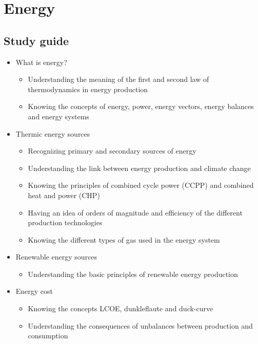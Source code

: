 \documentclass[../summary.tex]{subfiles}
\begin{document}
	
	\section{Energy}
	
	\subsection{Study guide}
	\begin{itemize} 
		\setlength{\itemsep}{0pt}
		
		\item What is energy?
		\begin{itemize}
			\item Understanding the meaning of the first and second law of thermodynamics in energy production
			\item Knowing the concepts of energy, power, energy vectors, energy balances and energy systems
		\end{itemize}
		
		\item Thermic energy sources
		\begin{itemize}
			\item Recognizing primary and secondary sources of energy
			\item Understanding the link between energy production and climate change
			\item Knowing the principles of combined cycle power (CCPP) and combined heat and power (CHP)
			\item Having an idea of orders of magnitude and efficiency of the different production technologies
			\item Knowing the different types of gas used in the energy system
		\end{itemize}
		
		\item Renewable energy sources
		\begin{itemize}
			\item Understanding the basic principles of renewable energy production
		\end{itemize}
		
		\item Energy cost
		\begin{itemize}
			\item Knowing the concepts LCOE, dunkleflaute and duck-curve
			\item Understanding the consequences of unbalances between production and consumption
		\end{itemize}
		

\end{itemize}
\end{document}

